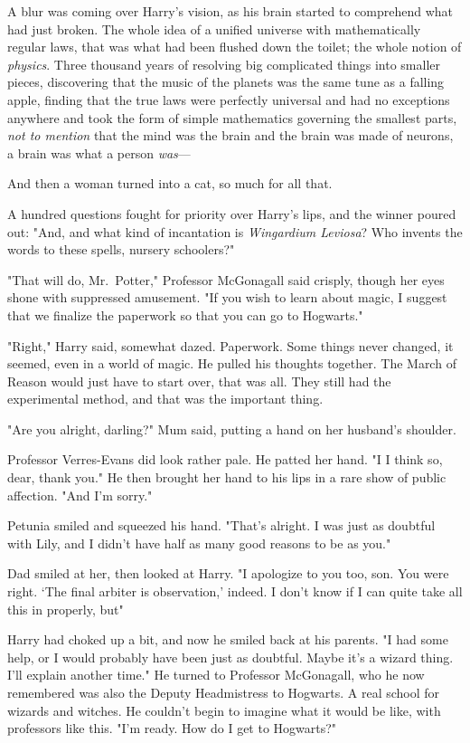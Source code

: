 A blur was coming over Harry's vision, as his brain started to comprehend what
had just broken. The whole idea of a unified universe with mathematically
regular laws, that was what had been flushed down the toilet; the whole notion
of \emph{physics}. Three thousand years of resolving big complicated things
into smaller pieces, discovering that the music of the planets was the same
tune as a falling apple, finding that the true laws were perfectly universal
and had no exceptions anywhere and took the form of simple mathematics governing the
smallest parts, \emph{not to mention} that the mind was the brain and the brain
was made of neurons, a brain was what a person \emph{was}—

And then a woman turned into a cat, so much for all that.

A hundred questions fought for priority over Harry's lips, and the winner poured
out: "And, and what kind of incantation is \emph{Wingardium Leviosa}? Who
invents the words to these spells, nursery schoolers?"

"That will do, Mr.~Potter," Professor McGonagall said crisply, though her eyes
shone with suppressed amusement. "If you wish to learn about magic, I suggest
that we finalize the paperwork so that you can go to Hogwarts."

"Right," Harry said, somewhat dazed. Paperwork. Some things
never changed, it seemed, even in a world of magic.
He pulled his thoughts together. The March
of Reason would just have to start over, that was all.
They still had the experimental method, and that was the important thing.

"Are you alright, darling?" Mum said, putting a hand on her
husband's shoulder.

Professor Verres-Evans did look rather pale. He patted her
hand. "I{\el} I think so, dear, thank you." He then brought
her hand to his lips in a rare show of public affection.
"And{\el} I'm sorry."

Petunia smiled and squeezed his hand. "That's alright. I
was just as doubtful with Lily, and I didn't have half as
many good reasons to be as you."

Dad smiled at her, then looked at Harry. "I apologize to
you too, son. You were right. `The final arbiter is
observation,' indeed. I don't know if I can quite take all
this in properly, but{\el}"

Harry had choked up a bit, and now he smiled back at his
parents. "I had some help, or I would probably have been
just as doubtful. Maybe it's a wizard thing. I'll explain
another time." He turned to Professor McGonagall, who he
now remembered was also the Deputy Headmistress to
Hogwarts. A real school for wizards and witches. He
couldn't begin to imagine what it would be like, with
professors like this. "I'm ready. How do I get to Hogwarts?"

